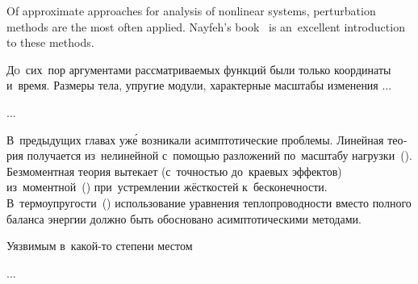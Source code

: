 

\thispagestyle{empty}

\label{chapter:asymptoticperturbationmethods}

{\small
Of approximate approaches for analysis of nonlinear systems, perturbation methods are the most often applied. Nayfeh’s book~\cite{nayfeh-perturbation} is an~excellent introduction to these methods.
\par}



\begin{otherlanguage}{russian}

\lettrine[lines=2, findent=2pt, nindent=0pt]{Д}{о}~сих~пор аргументами рассматриваемых функций были только координаты и~время. Размеры тела, упругие модули, характерные масштабы изменения ...

...


В~предыдущих главах уж\'{е} возникали асимптотические проблемы. Линейная теория получается из~нелинейной с~помощью разложений по~масштабу нагрузки~(). Безмоментная теория вытекает (с~точностью до~краевых эффектов) из~моментной~() при~устремлении  жёсткостей к~бесконечности. В~термо\-упругости~() использование уравнения теплопроводности вместо полного баланса энергии должно быть обосновано асимпто\-ти\-чес\-кими методами.

Уязвимым в~какой\hbox{-}то степени местом


...



\end{otherlanguage}

